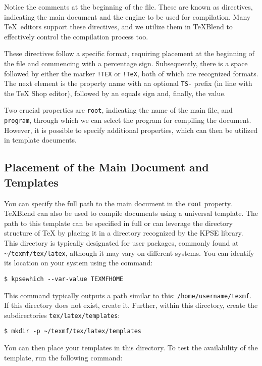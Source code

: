 Notice the comments at the beginning of the file. These are known as
directives, indicating the main document and the engine to be used for
compilation. Many \TeX\ editors support these directives, and we utilize them in
\TeX Blend to effectively control the compilation process too.

These directives follow a specific format, requiring placement at the beginning
of the file and commencing with a percentage sign. Subsequently, there is a
space followed by either the marker \texttt{!TEX} or \texttt{!TeX}, 
both of which are recognized formats. 
The next element is the property name with an optional \texttt{TS-} prefix 
(in line with the TeX Shop editor), followed by an equals sign and, finally, the
value.

Two crucial properties are \texttt{root}, indicating the name of the main file, and
\texttt{program}, through which we can select the program for compiling the document.
However, it is possible to specify additional properties, which can then be
utilized in template documents.

\subsection{Placement of the Main Document and Templates}

You can specify the full path to the main document in the \verb|root| property.
\TeX Blend can also be used to compile documents using a universal template. 
The path to this template can be specified in full or can leverage the directory
structure of TeX by placing it in a directory recognized by the KPSE library.
This directory is typically designated for user packages, commonly found at
\verb|~/texmf/tex/latex|, although it may vary on different systems. 
You can identify its location on your system using the command:

\begin{verbatim}
$ kpsewhich --var-value TEXMFHOME
\end{verbatim}

This command typically outputs a path similar to this: \texttt{/home/username/texmf}.
If this directory does not exist, create it. Further, within this directory,
create the subdirectories \texttt{tex/latex/templates}:

\begin{verbatim}
$ mkdir -p ~/texmf/tex/latex/templates
\end{verbatim}

You can then place your templates in this directory. 
To test the availability of the template, run the following command:

